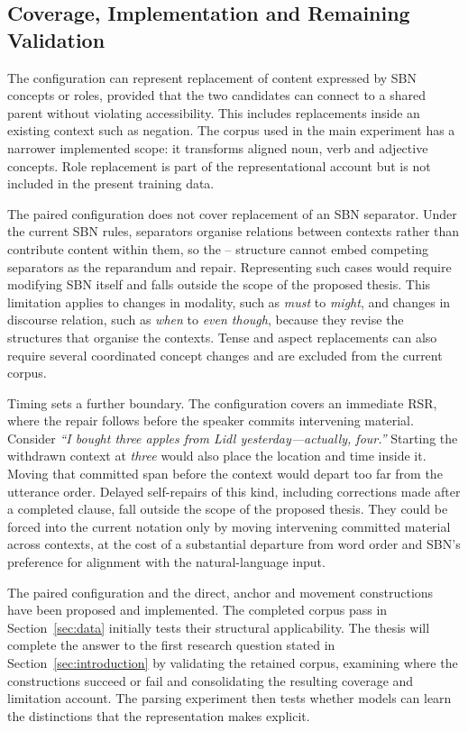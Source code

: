 \subsection{Coverage, Implementation and Remaining Validation}
\label{sec:formalism-coverage}

The configuration can represent replacement of content expressed by SBN
concepts or roles, provided that the two candidates can connect to a shared
parent without violating accessibility. This includes replacements inside an
existing context such as negation. The corpus used in the main experiment has
a narrower implemented scope: it transforms aligned noun, verb and adjective
concepts. Role replacement is part of the representational account but is not
included in the present training data.

The paired configuration does not cover replacement of an SBN separator.
Under the current SBN rules, separators organise relations between contexts
rather than contribute content within them, so the
-- structure cannot embed competing
separators as the reparandum and repair. Representing such cases would require
modifying SBN itself and falls outside the scope of the proposed thesis. This
limitation applies to changes in modality, such as \textit{must} to
\textit{might}, and changes in discourse relation, such as \textit{when} to
\textit{even though}, because they revise the structures that organise the
contexts. Tense and aspect replacements can also require several coordinated
concept changes and are excluded from the current corpus.

Timing sets a further boundary. The configuration covers an immediate RSR,
where the repair follows before the speaker commits intervening material.
Consider \textit{``I bought three apples from Lidl yesterday---actually,
four.''} Starting the withdrawn context at \textit{three} would also place the
location and time inside it. Moving that committed span before the context
would depart too far from the utterance order. Delayed self-repairs of this kind,
including corrections made after a completed clause, fall outside the scope of
the proposed thesis. They could be forced into the current notation only by
moving intervening committed material across contexts, at the cost of a
substantial departure from word order and SBN's preference for alignment with
the natural-language input.

The paired configuration and the direct, anchor and movement constructions
have been proposed and implemented. The completed corpus pass in
Section~\ref{sec:data} initially tests their structural applicability. The
thesis will complete the answer to the first research
question stated in Section~\ref{sec:introduction} by validating the retained corpus, examining where the constructions
succeed or fail and consolidating the resulting coverage and limitation
account. The parsing experiment then tests whether models can learn the
distinctions that the representation makes explicit.